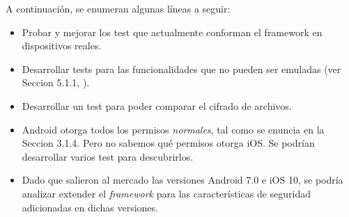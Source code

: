 A continuación, se enumeran algunas líneas a seguir:
\begin{itemize}
    \item Probar y mejorar los test que actualmente conforman el framework en dispositivos reales.
    \item Desarrollar tests para las funcionalidades que no pueden ser emuladas (ver Seccion 5.1.1, \cite{foda, foda2}).
    \item Desarrollar un test para poder comparar el cifrado de archivos.
    \item Android otorga todos los permisos \emph{normales}, tal como se enuncia en la Seccion 3.1.4. Pero no sabemos qué permisos otorga iOS. Se podrían desarrollar varios test para descubrirlos.
    \item Dado que salieron al mercado las versiones Android 7.0 e iOS 10, se podría analizar extender el \emph{framework} para las características de seguridad adicionadas en dichas versiones.
\end{itemize}